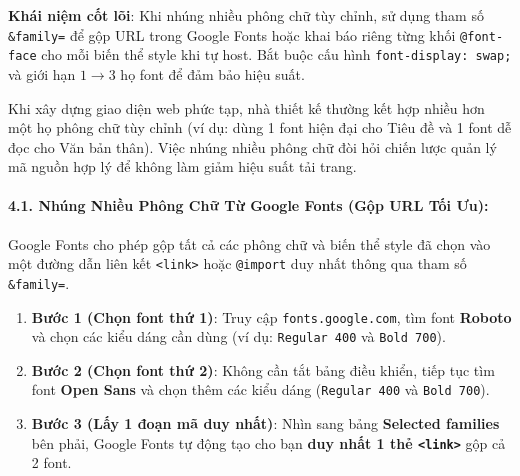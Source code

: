 \documentclass[11pt,oneside]{book}
\newcommand{\codeinline}[1]{\textcolor{accentOrange}{\texttt{#1}}}
\newcommand{\term}[1]{\textbf{\textcolor{primaryBlue}{#1}}}
\begin{document}
\begin{conceptBox}
\textbf{Khái niệm cốt lõi}: Khi nhúng nhiều phông chữ tùy chỉnh, sử dụng tham số \codeinline{\&family=} để gộp URL trong Google Fonts hoặc khai báo riêng từng khối \codeinline{@font-face} cho mỗi biến thể style khi tự host. Bắt buộc cấu hình \codeinline{font-display: swap;} và giới hạn $1 \rightarrow 3$ họ font để đảm bảo hiệu suất.
\end{conceptBox}

\label{sec:multi_font_embedding}

Khi xây dựng giao diện web phức tạp, nhà thiết kế thường kết hợp nhiều hơn một họ phông chữ tùy chỉnh (ví dụ: dùng 1 font hiện đại cho Tiêu đề và 1 font dễ đọc cho Văn bản thân). Việc nhúng nhiều phông chữ đòi hỏi chiến lược quản lý mã nguồn hợp lý để không làm giảm hiệu suất tải trang.

\paragraph{4.1. Nhúng Nhiều Phông Chữ Từ Google Fonts (Gộp URL Tối Ưu):}

Google Fonts cho phép gộp tất cả các phông chữ và biến thể style đã chọn vào một đường dẫn liên kết \codeinline{<link>} hoặc \codeinline{@import} duy nhất thông qua tham số \codeinline{\&family=}.

\begin{conceptBox}
\begin{enumerate}[leftmargin=1.5em, itemsep=3pt, parsep=0pt]
    \item \textbf{Bước 1 (Chọn font thứ 1)}: Truy cập \codeinline{fonts.google.com}, tìm font \textbf{Roboto} và chọn các kiểu dáng cần dùng (ví dụ: \codeinline{Regular 400} và \codeinline{Bold 700}).
    \item \textbf{Bước 2 (Chọn font thứ 2)}: Không cần tắt bảng điều khiển, tiếp tục tìm font \textbf{Open Sans} và chọn thêm các kiểu dáng (\codeinline{Regular 400} và \codeinline{Bold 700}).
    \item \textbf{Bước 3 (Lấy 1 đoạn mã duy nhất)}: Nhìn sang bảng \term{Selected families} bên phải, Google Fonts tự động tạo cho bạn \textbf{duy nhất 1 thẻ \codeinline{<link>}} gộp cả 2 font.
\end{enumerate}
\end{conceptBox}
\end{document}
